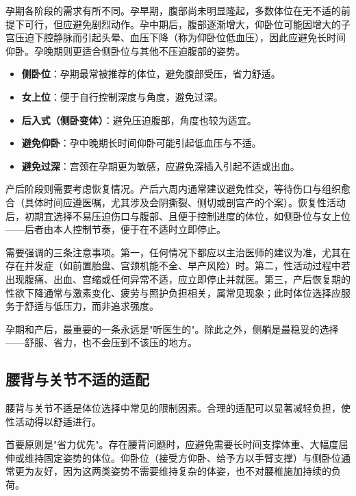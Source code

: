 \documentclass[12pt,UTF8]{ctexbook}
\newcommand{\keyword}[1]{\textbf{#1}}
\begin{document}
孕期各阶段的需求有所不同。孕早期，腹部尚未明显隆起，多数体位在无不适的前提下可行，但应避免剧烈动作。孕中期后，腹部逐渐增大，仰卧位可能因增大的子宫压迫下腔静脉而引起头晕、血压下降（称为仰卧位低血压），因此应避免长时间仰卧。孕晚期则更适合侧卧位与其他不压迫腹部的姿势。

\begin{itemize}
  \item \keyword{侧卧位}：孕期最常被推荐的体位，避免腹部受压，省力舒适。
  \item \keyword{女上位}：便于自行控制深度与角度，避免过深。
  \item \keyword{后入式（侧卧变体）}：避免压迫腹部，角度也较为适宜。
  \item \keyword{避免仰卧}：孕中晚期长时间仰卧可能引起低血压与不适。
  \item \keyword{避免过深}：宫颈在孕期更为敏感，应避免深插入引起不适或出血。
\end{itemize}

产后阶段则需要考虑恢复情况。产后六周内通常建议避免性交，等待伤口与组织愈合（具体时间应遵医嘱，尤其涉及会阴撕裂、侧切或剖宫产的个案）。恢复性活动后，初期宜选择不易压迫伤口与腹部、且便于控制进度的体位，如侧卧位与女上位——后者由本人控制节奏，便于在不适时立即停止。

需要强调的三条注意事项。第一，任何情况下都应以主治医师的建议为准，尤其在存在并发症（如前置胎盘、宫颈机能不全、早产风险）时。第二，性活动过程中若出现腹痛、出血、宫缩或任何异常不适，应立即停止并就医。第三，产后恢复期的性欲下降通常与激素变化、疲劳与照护负担相关，属常见现象；此时体位选择应服务于舒适与低压力，而非追求强度。

\begin{tcolorbox}[colback=pink!5!white,colframe=red!50!black,title=贴心小叮咛]
孕期和产后，最重要的一条永远是"听医生的"。除此之外，侧躺是最稳妥的选择——舒服、省力，也不会压到不该压的地方。
\end{tcolorbox}

\subsection{腰背与关节不适的适配}

腰背与关节不适是体位选择中常见的限制因素。合理的适配可以显著减轻负担，使性活动得以舒适进行。

首要原则是"省力优先"。存在腰背问题时，应避免需要长时间支撑体重、大幅度屈伸或维持固定姿势的体位。仰卧位（接受方仰卧、给予方以手臂支撑）与侧卧位通常更为友好，因为这两类姿势不需要维持复杂的体姿，也不对腰椎施加持续的负荷。
\end{document}

